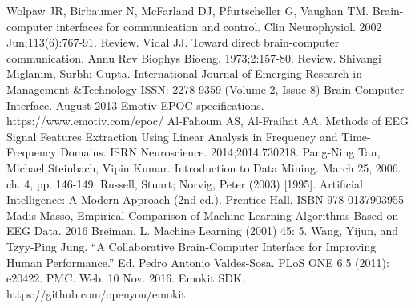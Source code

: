 \documentclass[12pt]{article}
\begin{document}
\newpage
\begin{thebibliography}{9}

Wolpaw JR, Birbaumer N, McFarland DJ, Pfurtscheller G, Vaughan TM.
Brain-computer interfaces for communication and control. Clin Neurophysiol. 2002 
Jun;113(6):767-91. Review.
Vidal JJ. Toward direct brain-computer communication. Annu Rev Biophys Bioeng.
1973;2:157-80. Review.
Shivangi Miglanim, Surbhi Gupta.  International Journal of Emerging Research in Management \&Technology
ISSN: 2278-9359 (Volume-2, Issue-8)
Brain Computer Interface. 
August 2013
Emotiv EPOC specifications. https://www.emotiv.com/epoc/
Al-Fahoum AS, Al-Fraihat AA. Methods of EEG Signal Features Extraction Using Linear Analysis in Frequency and Time-Frequency Domains. ISRN Neuroscience. 2014;2014:730218.
Pang-Ning Tan, Michael Steinbach, Vipin Kumar. Introduction to Data Mining. March 25, 2006. ch. 4, pp. 146-149.
Russell, Stuart; Norvig, Peter (2003) [1995]. Artificial Intelligence: A Modern Approach (2nd ed.). Prentice Hall. ISBN 978-0137903955
Madis Masso, Empirical Comparison of Machine Learning Algorithms Based on EEG Data. 2016
Breiman, L. Machine Learning (2001) 45: 5. 
Wang, Yijun, and Tzyy-Ping Jung. ``A Collaborative Brain-Computer Interface for Improving Human Performance.'' Ed. Pedro Antonio Valdes-Sosa. PLoS ONE 6.5 (2011): e20422. PMC. Web. 10 Nov. 2016.
Emokit SDK. https://github.com/openyou/emokit
\end{thebibliography}

%

\appendix
\end{document}
